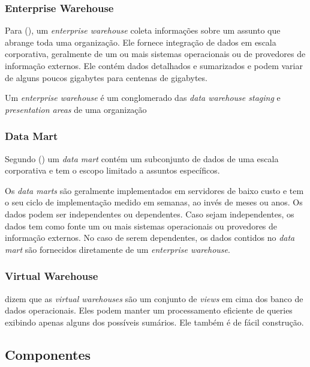 \subsubsection{Enterprise Warehouse}
Para \citeauthor{jmj} (\citeyear{jmj}), um \textit{enterprise warehouse} coleta informações sobre um assunto que abrange toda uma organização. Ele fornece integração de dados em escala corporativa, geralmente de um ou mais sistemas operacionais ou de provedores de informação externos. Ele contém dados detalhados e sumarizados e podem variar de alguns poucos gigabytes para centenas de gigabytes.

Um \textit{enterprise warehouse} é um conglomerado das \textit{data warehouse staging} e \textit{presentation areas} de uma organização \citep{kimball2002}


\subsubsection{Data Mart}
Segundo \citeauthor{jmj} (\citeyear{jmj}) um \textit{data mart} contém um subconjunto de dados de uma escala corporativa e tem o escopo limitado a assuntos específicos.

Os \textit{data marts} são geralmente implementados em servidores de baixo custo e tem o seu ciclo de implementação medido em semanas, ao invés de meses ou anos. Os dados podem ser independentes ou dependentes. Caso sejam independentes, os dados tem como fonte um ou mais sistemas operacionais ou provedores de informação externos. No caso de serem dependentes, os dados contidos no \textit{data mart} são fornecidos diretamente de um \textit{enterprise warehouse}.

\subsubsection{Virtual Warehouse}
 dizem que as \textit{virtual warehouses} são um conjunto de \textit{views} em cima dos banco de dados operacionais. Eles podem manter um processamento eficiente de queries exibindo apenas alguns dos possíveis sumários. Ele também é de fácil construção.

\subsection{Componentes}


